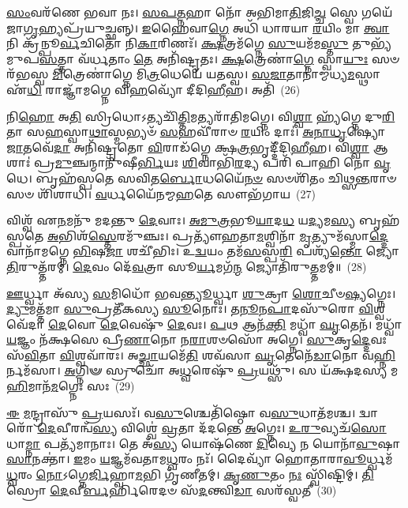 \-\ul{𑌸𑌂}\-𑌵𑌰᳴𑌣𑍇 𑌭𑌵𑌾 𑌨𑌃। \ul{𑌸}\-\-\ul{𑌪}\-\-\ul{𑌤𑍍𑌨}\-𑌹𑌾 𑌨𑍋᳴ 𑌅𑌭𑌿𑌮𑌾\-\ul{𑌤𑌿}\-𑌜𑌿\-\ul{𑌚𑍍𑌚} 𑌸𑍍𑌵𑍇 𑌗𑌯𑍇᳴ 𑌜𑌾\-\ul{𑌗𑍃}\-𑌹𑍍𑌯𑌪𑍍𑌰᳴𑌯𑍁𑌚𑍍𑌛𑌨𑍍𑌨𑍍। \ul{𑌇}\-𑌹𑍈𑌵𑌾\-\ul{𑌗𑍍𑌨𑍇} 𑌅𑌧𑌿᳴ 𑌧𑌾𑌰𑌯𑌾 \ul{𑌰}\-𑌯𑌿𑌂 𑌮𑌾 \ul{𑌤𑍍𑌵𑌾} 𑌨𑌿 𑌕𑍍𑌰᳴𑌨𑍍𑌪𑍂\-\ul{𑌰𑍍𑌵}\-𑌚𑌿𑌤𑍋᳴ 𑌨𑌿\-\ul{𑌕𑌾}\-𑌰𑌿𑌣𑌃᳴। \ul{𑌕𑍍𑌷}\-𑌤𑍍𑌰𑌮᳴𑌗𑍍𑌨𑍇 \ul{𑌸𑍁}\-𑌯𑌮᳴𑌮\-\ul{𑌸𑍍𑌤𑍁} 𑌤𑍁𑌭𑍍𑌯᳴𑌮𑍁𑌪\-\ul{𑌸}\-𑌤𑍍𑌤𑌾 𑌵᳴𑌰𑍍𑌧𑌤𑌾𑌂 \ul{𑌤𑍇} 𑌅𑌨𑌿᳴𑌷𑍍𑌟𑍃𑌤𑌃। \ul{𑌕𑍍𑌷}\-𑌤𑍍𑌰𑍇𑌣𑌾॑\-\ul{𑌗𑍍𑌨𑍇} 𑌸𑍍𑌵𑌾\-\ul{𑌯𑍁𑌃} 𑌸𑍞 𑌰᳴𑌭𑌸𑍍𑌵 \ul{𑌮𑌿}\-𑌤𑍍𑌰𑍇𑌣𑌾॑𑌗𑍍𑌨𑍇 𑌮𑌿\-\ul{𑌤𑍍𑌰}\-𑌧𑍇𑌯𑍇᳴ 𑌯𑌤𑌸𑍍𑌵। \ul{𑌸}\-\-\ul{𑌜𑌾}\-𑌤𑌾𑌨𑌾॑𑌮𑍍𑌮𑌧𑍍𑌯\-\ul{𑌮}\-𑌸𑍍𑌥𑌾 𑌏᳴\-\ul{𑌧𑌿} 𑌰𑌾𑌜𑍍𑌞𑌾᳴𑌮𑌗𑍍𑌨𑍇 𑌵𑌿\-\ul{𑌹}\-𑌵𑍍𑌯𑍋᳴ 𑌦𑍀𑌦𑌿\-\ul{𑌹𑍀}\-𑌹। 𑌅𑌤𑌿᳴~(26)

𑌨𑌿\-\ul{𑌹𑍋} 𑌅\-\ul{𑌤𑌿} 𑌸𑍍𑌰𑌿𑌧𑍋\-𑌽𑌤𑍍𑌯𑌚𑌿᳴\-\ul{𑌤𑍍𑌤𑌿}\-𑌮𑌤𑍍𑌯𑌰𑌾᳴𑌤𑌿𑌮𑌗𑍍𑌨𑍇। 𑌵𑌿\-\ul{𑌶𑍍𑌵𑌾} 𑌹𑍍𑌯᳴𑌗𑍍𑌨𑍇 𑌦𑍁\-\ul{𑌰𑌿}\-𑌤𑌾 𑌸\-\ul{𑌹}\-𑌸𑍍𑌵𑌾\-\ul{𑌥𑌾}\-𑌸𑍍𑌮𑌭𑍍𑌯𑍞᳴ \ul{𑌸}\-𑌹𑌵𑍀᳴𑌰𑌾𑍞 \ul{𑌰}\-𑌯𑌿𑌂 𑌦𑌾𑌃॑। \ul{𑌅}\-\-\ul{𑌨𑌾}\-\-\ul{𑌧𑍃}\-𑌷𑍍𑌯𑍋 \ul{𑌜𑌾}\-𑌤𑌵𑍇᳴\-\ul{𑌦𑌾} 𑌅𑌨𑌿᳴𑌷𑍍𑌟𑍃𑌤𑍋 \ul{𑌵𑌿}\-𑌰𑌾𑌡᳴𑌗𑍍𑌨𑍇 𑌕𑍍𑌷\-\ul{𑌤𑍍𑌰}\-𑌭𑍃𑌦𑍍𑌦𑍀᳴𑌦𑌿\-\ul{𑌹𑍀}\-𑌹। 𑌵𑌿\-\ul{𑌶𑍍𑌵𑌾} 𑌆𑌶𑌾𑌃॑ 𑌪𑍍𑌰\-\ul{𑌮𑍁}\-𑌞𑍍𑌚𑌨𑍍𑌮𑌾𑌨𑍁᳴𑌷𑍀\-\ul{𑌰𑍍𑌭𑌿}\-𑌯𑌃 \ul{𑌶𑌿}\-𑌵𑌾𑌭𑌿᳴\-\ul{𑌰}\-𑌦𑍍𑌯 𑌪𑌰𑌿᳴ 𑌪𑌾𑌹𑌿 𑌨𑍋 \ul{𑌵𑍃}\-𑌧𑍇। 𑌬𑍃𑌹᳴𑌸𑍍𑌪𑌤𑍇 𑌸𑌵𑌿𑌤\-\ul{𑌰𑍍𑌬𑍋}\-𑌧𑌯𑍈᳴\-\ul{𑌨}\-\-\ul{𑍞} 𑌸𑍞𑌶𑌿᳴𑌤𑌂 𑌚𑌿𑌥𑍍𑌸\-\ul{𑌨𑍍𑌤}\-𑌰𑌾𑍞 𑌸𑍞 𑌶𑌿᳴𑌶𑌾𑌧𑌿। \ul{𑌵}\-𑌰𑍍𑌧𑌯𑍈᳴𑌨𑌮𑍍𑌮\-\ul{𑌹}\-𑌤𑍇 𑌸𑍗𑌭᳴𑌗𑌾𑌯~(27)

𑌵𑌿𑌶𑍍𑌵᳴ 𑌏\-\ul{𑌨}\-𑌮𑌨𑍁᳴ 𑌮𑌦𑌨𑍍𑌤𑍁 \ul{𑌦𑍇}\-𑌵𑌾𑌃। \ul{𑌅}\-\-\ul{𑌮𑍁}\-\-\ul{𑌤𑍍𑌰}\-𑌭𑍂\-\ul{𑌯𑌾}\-𑌦\-\ul{𑌧} 𑌯\-\ul{𑌦𑍍𑌯}\-𑌮\-\ul{𑌸𑍍𑌯} 𑌬𑍃𑌹᳴𑌸𑍍𑌪𑌤𑍇 \ul{𑌅}\-𑌭𑌿𑌶᳴\-\ul{𑌸𑍍𑌤𑍇}\-𑌰𑌮𑍁᳴𑌞𑍍𑌚𑌃। 𑌪𑍍𑌰𑌤𑍍𑌯𑍗᳴𑌹𑌤𑌾\-\ul{𑌮}\-𑌶𑍍𑌵𑌿𑌨𑌾᳴ \ul{𑌮𑍃}\-𑌤𑍍𑌯𑍁𑌮᳴𑌸𑍍𑌮𑌾\-\ul{𑌦𑍍𑌦𑍇}\-𑌵𑌾𑌨𑌾᳴𑌮𑌗𑍍𑌨𑍇 \ul{𑌭𑌿}\-𑌷\-\ul{𑌜𑌾} 𑌶𑌚𑍀᳴𑌭𑌿𑌃। 𑌉\-\ul{𑌦𑍍𑌵}\-𑌯𑌂 𑌤𑌮᳴\-\ul{𑌸}\-𑌸𑍍𑌪\-\ul{𑌰𑌿} 𑌪𑌶𑍍𑌯᳴\-\ul{𑌨𑍍𑌤𑍋} 𑌜𑍍𑌯𑍋\-\ul{𑌤𑌿}\-𑌰𑍁𑌤𑍍𑌤᳴𑌰𑌮𑍍। \ul{𑌦𑍇}\-𑌵𑌂 𑌦𑍇᳴\-\ul{𑌵}\-𑌤𑍍𑌰𑌾 𑌸𑍂\-\ul{𑌰𑍍𑌯}\-𑌮𑌗᳴\-\ul{𑌨𑍍𑌮} 𑌜𑍍𑌯𑍋𑌤𑌿᳴𑌰𑍁\-\ul{𑌤𑍍𑌤}\-𑌮𑌮𑍍॥~(28)

{\anuvakamend[{\-\ul{𑌇}\-𑌮𑍇 \ul{𑌶𑌿}\-𑌵𑍋 \ul{𑌅}\-𑌗𑍍𑌨𑍇\-𑌽\-\ul{𑌤𑌿} 𑌸𑍗𑌭᳴𑌗𑌾\-\ul{𑌯} 𑌚𑌤𑍁᳴𑌸𑍍𑌤𑍍𑌰𑌿𑍞𑌶𑌚𑍍𑌚}]}%

\-\ul{𑌊}\-𑌰𑍍𑌧𑍍𑌵𑌾 𑌅᳴𑌸𑍍𑌯 \ul{𑌸}\-𑌮𑌿𑌧𑍋᳴ 𑌭𑌵\-\ul{𑌨𑍍𑌤𑍍𑌯𑍂}\-𑌰𑍍𑌧𑍍𑌵𑌾 \ul{𑌶𑍁}\-𑌕𑍍𑌰𑌾 \ul{𑌶𑍋}\-𑌚𑍀𑍞\-\ul{𑌷𑍍𑌯}\-𑌗𑍍𑌨𑍇𑌃। \ul{𑌦𑍍𑌯𑍁}\-𑌮𑌤𑍍𑌤᳴𑌮𑌾 \ul{𑌸𑍁}\-𑌪𑍍𑌰𑌤𑍀᳴𑌕𑌸𑍍𑌯 \ul{𑌸𑍂}\-𑌨𑍋𑌃। 𑌤\-\ul{𑌨𑍂}\-𑌨\-\ul{𑌪𑌾}\-𑌦𑌸𑍁᳴𑌰𑍋 \ul{𑌵𑌿}\-𑌶𑍍𑌵𑌵𑍇᳴𑌦𑌾 \ul{𑌦𑍇}\-𑌵𑍋 \ul{𑌦𑍇}\-𑌵𑍇𑌷𑍁᳴ \ul{𑌦𑍇}\-𑌵𑌃। \ul{𑌪}\-𑌥 𑌆𑌨᳴\-\ul{𑌕𑍍𑌤𑌿} 𑌮𑌧𑍍𑌵𑌾᳴ \ul{𑌘𑍃}\-𑌤𑍇𑌨᳴। 𑌮𑌧𑍍𑌵𑌾᳴ \ul{𑌯}\-𑌜𑍍𑌞𑌂 𑌨᳴𑌕𑍍𑌷𑌸𑍇 𑌪𑍍𑌰𑍀\-\ul{𑌣𑌾}\-𑌨𑍋 𑌨\-\ul{𑌰𑌾}\-𑌶𑍞𑌸𑍋᳴ 𑌅𑌗𑍍𑌨𑍇। \ul{𑌸𑍁}\-𑌕𑍃\-\ul{𑌦𑍍𑌦𑍇}\-𑌵𑌃 𑌸᳴\-\ul{𑌵𑌿}\-𑌤𑌾 \ul{𑌵𑌿}\-𑌶𑍍𑌵𑌵𑌾᳴𑌰𑌃। 𑌅\-\ul{𑌚𑍍𑌛𑌾}\-𑌯𑌮𑍇᳴\-\ul{𑌤𑌿} 𑌶𑌵᳴𑌸𑌾 \ul{𑌘𑍃}\-𑌤𑍇𑌨𑍇᳴\-\ul{𑌡𑌾}\-𑌨𑍋 𑌵\-\ul{𑌹𑍍𑌨𑌿}\-𑌰𑍍𑌨𑌮᳴𑌸𑌾। \ul{𑌅}\-𑌗𑍍𑌨𑌿𑍟 𑌸𑍍𑌰𑍁𑌚𑍋᳴ 𑌅\-\ul{𑌧𑍍𑌵}\-𑌰𑍇𑌷𑍁᳴ \ul{𑌪𑍍𑌰}\-𑌯𑌥𑍍𑌸𑍁᳴। 𑌸 𑌯᳴𑌕𑍍𑌷𑌦𑌸𑍍𑌯 𑌮\-\ul{𑌹𑌿}\-𑌮𑌾𑌨᳴\-\ul{𑌮}\-𑌗𑍍𑌨𑍇𑌃 𑌸𑌃~(29)

\-\ul{𑌈} \ul{𑌮}\-𑌨𑍍𑌦𑍍𑌰𑌾𑌸𑍁᳴ \ul{𑌪𑍍𑌰}\-𑌯𑌸𑌃᳴। 𑌵\-\ul{𑌸𑍁}\-𑌶𑍍𑌚𑍇𑌤𑌿᳴𑌷𑍍𑌠𑍋 𑌵\-\ul{𑌸𑍁}\-𑌧𑌾𑌤᳴𑌮𑌶𑍍𑌚। 𑌦𑍍𑌵𑌾𑌰𑍋᳴ \ul{𑌦𑍇}\-𑌵𑍀𑌰𑌨𑍍𑌵᳴\-\ul{𑌸𑍍𑌯} 𑌵𑌿𑌶𑍍𑌵𑍇॑ \ul{𑌵𑍍𑌰}\-𑌤𑌾 𑌦᳴𑌦𑌨𑍍𑌤𑍇 \ul{𑌅}\-𑌗𑍍𑌨𑍇𑌃। \ul{𑌉}\-\-\ul{𑌰𑍁}\-𑌵𑍍𑌯𑌚᳴\-\ul{𑌸𑍋} 𑌧𑌾\-\ul{𑌮𑍍𑌨𑌾} 𑌪𑌤𑍍𑌯᳴𑌮𑌾𑌨𑌾𑌃। 𑌤𑍇 𑌅᳴\-\ul{𑌸𑍍𑌯} 𑌯𑍋𑌷᳴𑌣𑍇 \ul{𑌦𑌿}\-𑌵𑍍𑌯𑍇 𑌨 𑌯𑍋𑌨𑌾᳴\-\ul{𑌵𑍁}\-𑌷𑌾\-\ul{𑌸𑌾}\-𑌨𑌕𑍍𑌤𑌾॑। \ul{𑌇}\-𑌮𑌂 \ul{𑌯}\-𑌜𑍍𑌞𑌮᳴𑌵𑌤𑌾𑌮\-\ul{𑌧𑍍𑌵}\-𑌰𑌂 𑌨𑌃᳴। 𑌦𑍈𑌵𑍍𑌯𑌾᳴ 𑌹𑍋𑌤𑌾𑌰𑌾\-\ul{𑌵𑍂}\-𑌰𑍍𑌧𑍍𑌵𑌮᳴\-\ul{𑌧𑍍𑌵}\-𑌰𑌂 \ul{𑌨𑍋}\-\-𑌽𑌗𑍍𑌨𑍇\-\ul{𑌰𑍍𑌜𑌿}\-𑌹𑍍𑌵𑌾\-\ul{𑌮}\-𑌭𑌿 𑌗𑍃᳴𑌣𑍀𑌤𑌮𑍍। \ul{𑌕𑍃}\-\-\ul{𑌣𑍁}\-𑌤𑌂 \ul{𑌨𑌃} 𑌸𑍍𑌵𑌿᳴𑌷𑍍𑌟𑌿𑌮𑍍। \ul{𑌤𑌿}\-𑌸𑍍𑌰𑍋 \ul{𑌦𑍇}\-𑌵𑍀\-\ul{𑌰𑍍𑌬}\-𑌰𑍍𑌹𑌿𑌰𑍇𑌦𑍞 𑌸᳴\-\ul{𑌦}\-𑌨𑍍𑌤𑍍𑌵𑌿\-\ul{𑌡𑌾} 𑌸𑌰᳴𑌸𑍍𑌵𑌤𑍀~(30)

